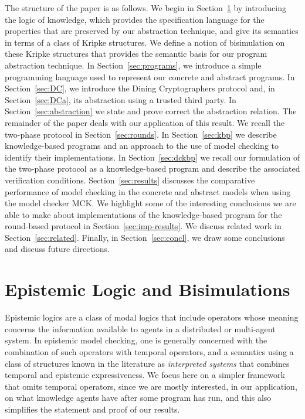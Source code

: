 \documentclass[]{llncs}
\begin{document}
The structure of the paper is as follows. We begin in Section~\ref{sec:knowledge}  
by introducing the logic of knowledge, which provides the specification language for the
properties that are preserved by our abstraction technique, and give its semantics in 
terms of a class of Kripke structures. We define a notion of bisimulation
on these Kripke structures that provides the semantic basis for our program abstraction technique. 
In Section~\ref{sec:programs}, we introduce a simple programming language 
used to represent our concrete and abstract programs.  In Section~\ref{sec:DC}, we 
introduce the Dining Cryptographers protocol and, in Section~\ref{sec:DCa},   its abstraction using a trusted 
third party. In Section~\ref{sec:abstraction} we state and prove correct the abstraction relation.  
The remainder of the paper deals with our application of this result. 
We recall the two-phase protocol in Section~\ref{sec:rounds}. In Section~\ref{sec:kbp} we describe knowledge-based programs 
and an approach to the use of model checking to identify their implementations. 
In Section~\ref{sec:dckbp} we recall our formulation of the two-phase protocol 
as a knowledge-based program and describe the associated verification conditions. 
Section~\ref{sec:results} discusses the comparative performance of
model checking in the concrete and abstract models when using the model checker MCK. 
We highlight some of the interesting conclusions we are able to make about implementations 
of the knowledge-based program for the round-based protocol in Section~\ref{sec:imp-results}. 
We discuss related work in Section~\ref{sec:related}. Finally, in Section~\ref{sec:concl},  we draw some conclusions and 
discuss future directions.  

\section{Epistemic Logic and Bisimulations}\label{sec:knowledge} 

Epistemic logics are a class of modal logics that
include operators whose meaning concerns
the information available to agents in a 
distributed or multi-agent system. 
In epistemic model checking, one is generally concerned
with the combination of such operators with 
temporal operators, and a semantics using 
a class of structures  known in the literature as  {\em interpreted 
systems} \cite{FHMVbook} that combines temporal and epistemic 
expressiveness. We focus here on a simpler framework that omits temporal operators, 
since we are mostly interested, in our application, on what knowledge agents have after some program has run, 
and this also simplifies the statement and proof of our results. 
\end{document}

